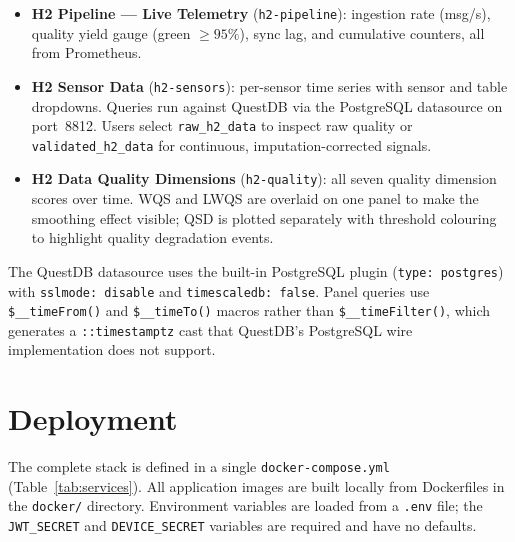 \begin{itemize}
  \item \textbf{H2 Pipeline --- Live Telemetry} (\texttt{h2-pipeline}):
        ingestion rate (msg/s), quality yield gauge (green $\geq 95\%$),
        sync lag, and cumulative counters, all from Prometheus.
  \item \textbf{H2 Sensor Data} (\texttt{h2-sensors}):
        per-sensor time series with sensor and table dropdowns.
        Queries run against QuestDB via the PostgreSQL datasource on
        port~8812.
        Users select \texttt{raw\_h2\_data} to inspect raw quality or
        \texttt{validated\_h2\_data} for continuous, imputation-corrected
        signals.
  \item \textbf{H2 Data Quality Dimensions} (\texttt{h2-quality}):
        all seven quality dimension scores over time.
        WQS and LWQS are overlaid on one panel to make the smoothing effect
        visible; QSD is plotted separately with threshold colouring to
        highlight quality degradation events.
\end{itemize}

The QuestDB datasource uses the built-in PostgreSQL plugin
(\texttt{type: postgres}) with \texttt{sslmode: disable} and
\texttt{timescaledb: false}.
Panel queries use \texttt{\$\_\_timeFrom()} and \texttt{\$\_\_timeTo()}
macros rather than \texttt{\$\_\_timeFilter()}, which generates a
\texttt{::timestamptz} cast that QuestDB's PostgreSQL wire implementation
does not support.

\section{Deployment}
\label{sec:deployment}

The complete stack is defined in a single \texttt{docker-compose.yml}
(Table~\ref{tab:services}).
All application images are built locally from Dockerfiles in the
\texttt{docker/} directory.
Environment variables are loaded from a \texttt{.env} file; the
\texttt{JWT\_SECRET} and \texttt{DEVICE\_SECRET} variables are required
and have no defaults.

